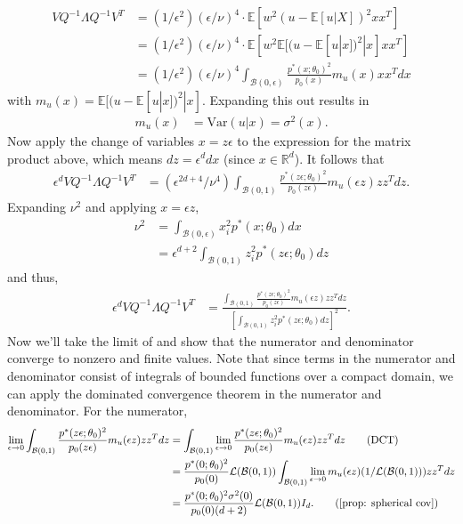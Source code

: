 \documentclass[11pt]{article}
\begin{document}
\begin{align*}
    VQ^{-1}\Lambda Q^{-1}V^T&= (1/\epsilon^2)(\epsilon/\nu)^{4} \cdot \mathbb{E}\left[w^2(u - \mathbb{E}[u|X])^2xx^T\right] \\
    &= (1/\epsilon^2)(\epsilon/\nu)^{4} \cdot \mathbb{E}\left[w^2\mathbb{E}[(u - \mathbb{E}[u|x])^2|x]xx^T\right]\\
    &= (1/\epsilon^2)(\epsilon/\nu)^{4}\int_{\mathcal{B}(0, \epsilon)} \frac{p^*(x; \theta_0)^2}{p_0(x)}m_u(x)xx^T dx
\end{align*}
with $m_u(x) = \mathbb{E}[(u - \mathbb{E}[u|x])^2|x]$. Expanding this out results in
\begin{align*}
    m_u(x) &= \text{Var}(u|x) = \sigma^2(x).
\end{align*}
Now apply the change of variables $x = z\epsilon$ to the expression for the matrix product above, which means $dz = \epsilon^ddx$ (since $x \in \mathbb{R}^d$). It follows that
\begin{align*}
    \epsilon^dVQ^{-1}\Lambda Q^{-1}V^T &= (\epsilon^{2d+4}/\nu^{4})\int_{\mathcal{B}(0, 1)} \frac{p^*(z\epsilon; \theta_0)^2}{p_0(z\epsilon)}m_u(\epsilon z)zz^T dz.
\end{align*}
Expanding $\nu^2$ and applying $x = \epsilon z$,
\begin{align*}
    \nu^2 &= \int_{\mathcal{B}(0, \epsilon)}x_i^2 p^*(x; \theta_0)dx \\
    &= \epsilon^{d+2} \int_{\mathcal{B}(0, 1)}z_i^2p^*(z\epsilon; \theta_0) dz
\end{align*}
and thus,
\begin{align}
    \epsilon^dVQ^{-1}\Lambda Q^{-1}V^T &= \frac{\int_{\mathcal{B}(0, 1)} \frac{p^*(z\epsilon; \theta_0)^2}{p_0(z\epsilon)}m_u(\epsilon z)zz^T dz}{\left[\int_{\mathcal{B}(0, 1)}z_i^2p^*(z\epsilon; \theta_0) dz\right]^2}. \label{eq: asymp var intermediate}
\end{align}
Now we'll take the limit of  and show that the numerator and denominator converge to nonzero and finite values. Note that since terms in the numerator and denominator consist of integrals of bounded functions over a compact domain, we can apply the dominated convergence theorem in the numerator and denominator. For the numerator,
\begin{align*}
    \lim_{\epsilon \rightarrow 0} \int_{\mathcal{B}(0, 1)} \frac{p^*(z\epsilon; \theta_0)^2}{p_0(z\epsilon)}m_u(\epsilon z)zz^T dz &= \int_{\mathcal{B}(0, 1)} \lim_{\epsilon \rightarrow 0}\frac{p^*(z\epsilon; \theta_0)^2}{p_0(z\epsilon)}m_u(\epsilon z)zz^T dz \tag{DCT} \\
    &= \frac{p^*(0; \theta_0)^2}{p_0(0)} \mathcal{L}(\mathcal{B}(0, 1))\int_{\mathcal{B}(0, 1)} \lim_{\epsilon \rightarrow 0}m_u(\epsilon z)(1/\mathcal{L}(\mathcal{B}(0, 1)))zz^T dz \\
    &= \frac{p^*(0; \theta_0)^2\sigma^2(0)}{p_0(0)(d+2)} \mathcal{L}(\mathcal{B}(0, 1))I_d. \tag{\Cref{prop: spherical cov}}
\end{align*}
\end{document}

